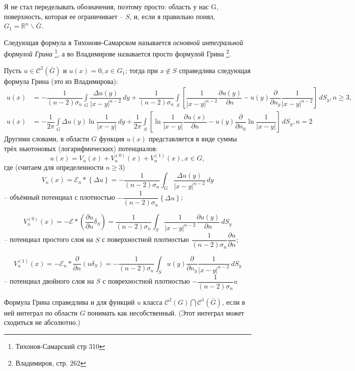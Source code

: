 Я не стал переделывать обозначения, поэтому просто: область у нас G, поверхность, которая ее
ограничивает -- $S$, и, если я правильно понял, $G_1 = \mathbb{R}^n \backslash \bar G$. 

Следующая формула в Тихонове-Самарском называется \emph{основной интегральной формулой Грина}
\footnote{Тихонов-Самарский стр 310}, а во Владимирове называется просто формулой Грина
\footnote{Владимиров, стр. 262}.

Пусть $u \in \mathcal{C}^2 (\bar G)$ и $u(x) = 0, x \in G_1$; тогда при $x \notin S$ справедлива
следующая формула Грина (это из Владимирова):
\begin{align*}
  u(x) &= - \dfrac{1}{(n-2) \sigma_n} \int\limits_G \dfrac{\Delta u(y)}{|x-y|^{n-2}} \, dy
  + \dfrac{1}{(n-2) \sigma_n} \int\limits_S \left[ 
    \dfrac{1}{|x-y|^{n-2}} \dfrac{\partial u(y)}{\partial n} 
    - u(y) \dfrac{\partial }{\partial n_y} \dfrac{1}{|x-y|^{n-2}}\right] \, dS_y, n \geqslant 3, \\
  u(x) &= - \dfrac{1}{2\pi} \int\limits_G \Delta u(y) \ln \dfrac{1}{|x-y|} \, dy
  + \dfrac{1}{2\pi} \int\limits_S \left[ 
    \ln \dfrac{1}{|x-y|} \dfrac{\partial u(s)}{\partial n} 
    - u(y) \dfrac{\partial }{\partial n_y} \ln \dfrac{1}{|x-y|} \right] \, dS_y, n=2
\end{align*}
Другими словами, в области $G$ функция $u(x)$ представляется в виде суммы трёх ньютоновых
(логарифмических) потенциалов:
\[
  u(x) = V_n(x) + V_n^{(0)} (x) + V_n^{(1)} (x), x\in G,
\]
где (считаем для определенности $n \geqslant 3$)
\[
  V_n(x) = \mathcal{E}_n * \left\{ \Delta u \right\} = - \dfrac{1}{(n-2) \sigma_n} \int_G \dfrac{\Delta u(y)}{|x-y|^{n-2}} \, dy
\]
-- объёмный потенциал с плотностью $- \dfrac{1}{(n-2) \sigma_n} \left\{ \Delta u \right\}$;

\[
  V_n^{(0)} (x) = - \mathcal{E} * \left( \dfrac{\partial u}{\partial n} \delta_S \right) 
  = \dfrac{1}{(n-2) \sigma_n} \int_S \dfrac{1}{|x-y|^{n-2}} \dfrac{\partial u(y)}{\partial n} \, dS_y
\]
-- потенциал простого слоя на $S$ с поверхностной плотностью $\dfrac{1}{(n-2) \sigma_n} \dfrac{\partial u}{\partial n}$;

\[
  V_n^{(1)} (x) = - \mathcal{E}_n * \dfrac{\partial }{\partial n} (u \delta_S)
  = - \dfrac{1}{(n-2) \sigma_n} \int_S u(y) \dfrac{\partial }{\partial n_y} \dfrac{1}{|x-y|^{n-2}} \, dS_y
\]
-- потенциал двойного слоя на $S$ с поврехностной плотностью $-\dfrac{1}{(n-2) \sigma_n} u$

Формула Грина справедлива и для функций $u$ класса
$\mathcal{C}^2 (G) \bigcap \mathcal{C}^1 (\bar G)$, если в ней интеграл по области $G$ понимать
как несобственный. (Этот интеграл может сходиться не абсолютно.)


